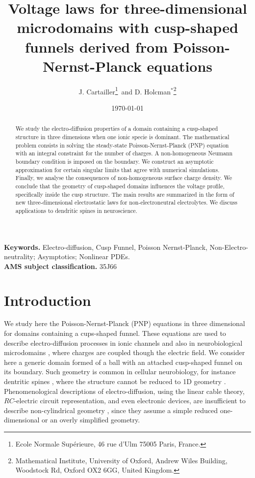\documentclass[12pt]{article}
\begin{document}
  \title{Voltage laws for three-dimensional microdomains with cusp-shaped funnels derived from Poisson-Nernst-Planck equations}
  \author{J. Cartailler\footnote{ Ecole Normale Sup\'erieure, 46 rue d'Ulm 75005 Paris, France.}
   \,and D. Holcman$^*$\footnote{Mathematical Institute, University of Oxford, Andrew Wiles Building, Woodstock Rd, Oxford OX2 6GG, United Kingdom. }}
  \date{\today}

\maketitle

\begin{abstract}
We study the electro-diffusion properties of a domain containing a cusp-shaped structure in three dimensions when one ionic specie is dominant.  The mathematical problem consists in solving the steady-state Poisson-Nernst-Planck (PNP) equation with an integral constraint for the number of charges. A non-homogeneous Neumann boundary condition is imposed on the boundary.  We construct an asymptotic approximation for certain singular limits that agree with numerical simulations. Finally, we analyse the consequences of non-homogeneous surface charge density. We conclude that the geometry of cusp-shaped domains influences the voltage profile, specifically inside the cusp structure. The main results are summarized in the form of new three-dimensional electrostatic laws for non-electroneutral electrolytes. We discuss applications to dendritic spines in neuroscience.
\end{abstract}	
{\bf Keywords.} Electro-diffusion, Cusp Funnel, Poisson Nernst-Planck, Non-Electro-neutrality; Asymptotics; Nonlinear PDEs.\\
\newline
{\bf AMS subject classification.}  35J66 %
\section{Introduction}
We study here the Poisson-Nernst-Planck (PNP) equations in three dimensional for domains containing a cups-shaped funnel. These equations are used to describe electro-diffusion processes in ionic channels \cite{Nadler,Singer} and also in neurobiological microdomains \cite{Hille,Bezanilla}, where charges are coupled though the electric field. We consider here a generic domain formed of a ball with an attached cusp-shaped funnel on its boundary. Such geometry is common in cellular neurobiology, for instance dentritic spines \cite{Harris}, where the structure cannot be reduced to 1D geometry \cite{HY2015}.  Phenomenological descriptions of electro-diffusion, using the linear cable theory, $RC$-electric circuit representation, and even electronic devices, are insufficient to describe non-cylindrical geometry \cite{Hille,HY2015}, since they assume a simple reduced one-dimensional or an overly simplified geometry.
\end{document}
